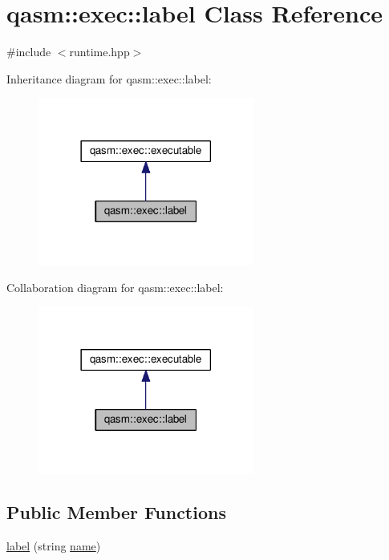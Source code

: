 \hypertarget{classqasm_1_1exec_1_1label}{}\section{qasm\+:\+:exec\+:\+:label Class Reference}
\label{classqasm_1_1exec_1_1label}


{\ttfamily \#include $<$runtime.\+hpp$>$}



Inheritance diagram for qasm\+:\+:exec\+:\+:label\+:
\nopagebreak
\begin{figure}[H]
\begin{center}
\leavevmode
\includegraphics[width=201pt]{classqasm_1_1exec_1_1label__inherit__graph}
\end{center}
\end{figure}


Collaboration diagram for qasm\+:\+:exec\+:\+:label\+:
\nopagebreak
\begin{figure}[H]
\begin{center}
\leavevmode
\includegraphics[width=201pt]{classqasm_1_1exec_1_1label__coll__graph}
\end{center}
\end{figure}
\subsection*{Public Member Functions}
\begin{DoxyCompactItemize}
\item 
\hyperlink{classqasm_1_1exec_1_1label_aea2a4500ead46240c26215b6d964fae4}{label} (string \hyperlink{classqasm_1_1exec_1_1label_ae88393dae0bd5ddbe32a65cfb2d8f247}{name})
\end{DoxyCompactItemize}
